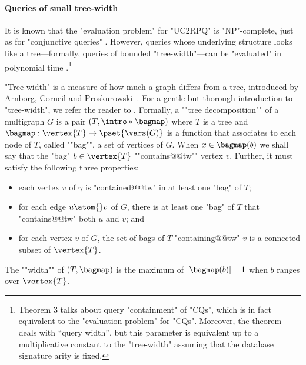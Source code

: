 \paragraph{Queries of small tree-width}
It is known that the "evaluation problem" for "UC2RPQ" is "NP"-complete, just as for "conjunctive queries"
\cite[Theorem 7]{DBLP:conf/stoc/ChandraM77}.
However, queries whose underlying structure looks like a tree---formally, queries of bounded 
"tree-width"---can be "evaluated" in polynomial time \cite[Theorem 3]{CHEKURI2000211}.\footnote{Theorem 3 talks about query "containment" of "CQs", which is in fact equivalent to the "evaluation problem" for "CQs". Moreover, the theorem deals with ``query width'', but this parameter is equivalent up to a multiplicative constant to the "tree-width" \cite[Lemma 2]{CHEKURI2000211} assuming that the database signature arity is fixed.} 

\AP
"Tree-width" is a measure of how much a
graph differs from a tree, introduced by Arnborg, Corneil and
Proskurowski~\cite{arnborg1987complexity}.
%
For a gentle but thorough introduction to "tree-width", we refer the reader to
\cite[\S 3.6]{sparsity12}. Formally, a \AP""tree decomposition"" of a multigraph $G$ is a
pair $(T, \intro*\bagmap)$ where $T$ is a tree and $\bagmap: \vertex{T} \to \pset{\vars(G)}$ is a function that associates to each node of $T$, called \AP""bag"",
a set of vertices of $G$. When $x \in \bagmap(b)$ we shall say that the "bag"
$b \in \vertex{T}$ \AP""contains@@tw"" vertex $v$. Further, it must satisfy the following three properties:
\begin{itemize}
    \item each vertex $v$ of $\gamma$ is "contained@@tw" in at least one "bag" of $T$;
    \item for each edge $u \atom{} v$ of $G$, there is at least one "bag" of $T$
        that "contains@@tw" both $u$ and $v$; and 
    \item for each vertex $v$ of $G$, the set of bags of $T$ "containing@@tw" $v$ is a 
        connected subset of $\vertex{T}$.
\end{itemize}
The \AP""width"" of $(T, \bagmap)$ is the maximum of $|\bagmap(b)|-1$ when $b$ ranges over
$\vertex{T}$.

